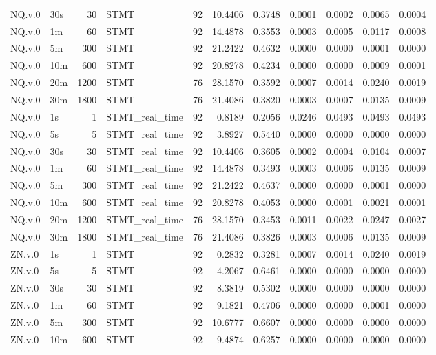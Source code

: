 \begin{tabular}{llrlrrrrrrr}
NQ.v.0 & 30s & 30 & STMT & 92 & 10.4406 & 0.3748 & 0.0001 & 0.0002 & 0.0065 & 0.0004 \\
NQ.v.0 & 1m & 60 & STMT & 92 & 14.4878 & 0.3553 & 0.0003 & 0.0005 & 0.0117 & 0.0008 \\
NQ.v.0 & 5m & 300 & STMT & 92 & 21.2422 & 0.4632 & 0.0000 & 0.0000 & 0.0001 & 0.0000 \\
NQ.v.0 & 10m & 600 & STMT & 92 & 20.8278 & 0.4234 & 0.0000 & 0.0000 & 0.0009 & 0.0001 \\
NQ.v.0 & 20m & 1200 & STMT & 76 & 28.1570 & 0.3592 & 0.0007 & 0.0014 & 0.0240 & 0.0019 \\
NQ.v.0 & 30m & 1800 & STMT & 76 & 21.4086 & 0.3820 & 0.0003 & 0.0007 & 0.0135 & 0.0009 \\
NQ.v.0 & 1s & 1 & STMT_real_time & 92 & 0.8189 & 0.2056 & 0.0246 & 0.0493 & 0.0493 & 0.0493 \\
NQ.v.0 & 5s & 5 & STMT_real_time & 92 & 3.8927 & 0.5440 & 0.0000 & 0.0000 & 0.0000 & 0.0000 \\
NQ.v.0 & 30s & 30 & STMT_real_time & 92 & 10.4406 & 0.3605 & 0.0002 & 0.0004 & 0.0104 & 0.0007 \\
NQ.v.0 & 1m & 60 & STMT_real_time & 92 & 14.4878 & 0.3493 & 0.0003 & 0.0006 & 0.0135 & 0.0009 \\
NQ.v.0 & 5m & 300 & STMT_real_time & 92 & 21.2422 & 0.4637 & 0.0000 & 0.0000 & 0.0001 & 0.0000 \\
NQ.v.0 & 10m & 600 & STMT_real_time & 92 & 20.8278 & 0.4053 & 0.0000 & 0.0001 & 0.0021 & 0.0001 \\
NQ.v.0 & 20m & 1200 & STMT_real_time & 76 & 28.1570 & 0.3453 & 0.0011 & 0.0022 & 0.0247 & 0.0027 \\
NQ.v.0 & 30m & 1800 & STMT_real_time & 76 & 21.4086 & 0.3826 & 0.0003 & 0.0006 & 0.0135 & 0.0009 \\
ZN.v.0 & 1s & 1 & STMT & 92 & 0.2832 & 0.3281 & 0.0007 & 0.0014 & 0.0240 & 0.0019 \\
ZN.v.0 & 5s & 5 & STMT & 92 & 4.2067 & 0.6461 & 0.0000 & 0.0000 & 0.0000 & 0.0000 \\
ZN.v.0 & 30s & 30 & STMT & 92 & 8.3819 & 0.5302 & 0.0000 & 0.0000 & 0.0000 & 0.0000 \\
ZN.v.0 & 1m & 60 & STMT & 92 & 9.1821 & 0.4706 & 0.0000 & 0.0000 & 0.0001 & 0.0000 \\
ZN.v.0 & 5m & 300 & STMT & 92 & 10.6777 & 0.6607 & 0.0000 & 0.0000 & 0.0000 & 0.0000 \\
ZN.v.0 & 10m & 600 & STMT & 92 & 9.4874 & 0.6257 & 0.0000 & 0.0000 & 0.0000 & 0.0000 \\

\end{tabular}
